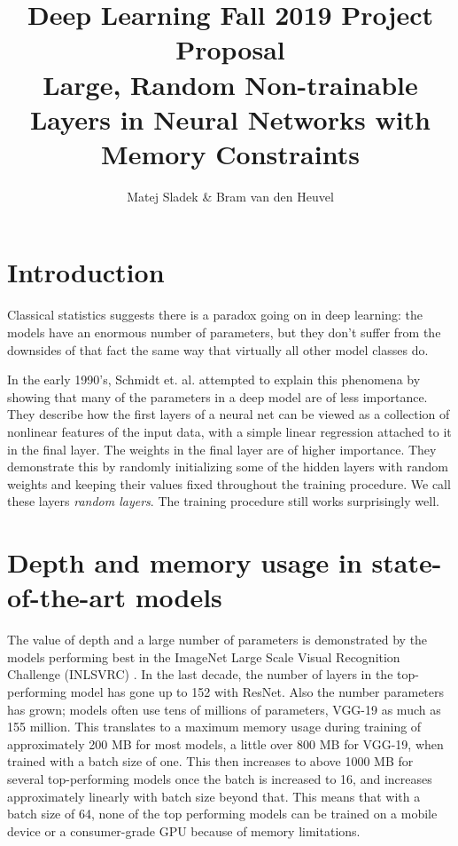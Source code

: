 \documentclass[]{article}
\title{\vspace{-2cm}Deep Learning Fall 2019 Project Proposal\\\large{Large, Random Non-trainable Layers in Neural Networks with Memory Constraints}}
\author{Matej Sladek \& Bram van den Heuvel}
\begin{document}
\maketitle

\begin{multicols}{2}
	\section{Introduction}
	Classical statistics suggests there is a paradox going on in deep learning: the models have an enormous number of parameters, but they don't suffer from the downsides of that fact the same way that virtually all other model classes do.
	
	In the early 1990's, Schmidt et. al. \cite{Schmidt_Kraaijveld_Duin} attempted to explain this phenomena by showing that many of the parameters in a deep model are of less importance. They describe how the first layers of a neural net can be viewed as a collection of nonlinear features of the input data, with a simple linear regression attached to it in the final layer. The weights in the final layer are of higher importance. They demonstrate this by randomly initializing some of the hidden layers with random weights and keeping their values fixed throughout the training procedure. We call these layers \emph{random layers}. The training procedure still works surprisingly well.
	
	
	\section{Depth and memory usage in state-of-the-art models}
	The value of depth and a large number of parameters is demonstrated by the models performing best in the ImageNet Large Scale Visual Recognition Challenge (INLSVRC) \cite{DBLP:journals/corr/CanzianiPC16}. In the last decade, the number of layers in the top-performing model has gone up to 152 with ResNet. Also the number parameters has grown; models often use tens of millions of parameters, VGG-19 as much as 155 million. This translates to a maximum memory usage during training of approximately 200 MB for most models, a little over 800 MB for VGG-19, when trained with a batch size of one. This then increases to above 1000 MB for several top-performing models once the batch is increased to 16, and increases approximately linearly with batch size beyond that. This means that with a batch size of 64, none of the top performing models can be trained on a mobile device or a consumer-grade GPU because of memory limitations.
	

\end{multicols}
\end{document}
